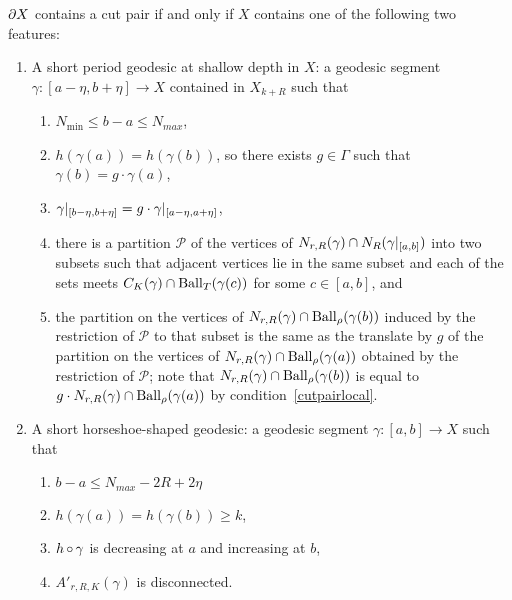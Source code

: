 \begin{prop}\label{prop:cutpairsfeature} $\partial X$ contains a cut pair
if and only if $X$ contains one of the following two features:
\begin{enumerate}
  \item A short period geodesic at shallow depth in $X$: a geodesic segment
    $\gamma \colon [a - \eta, b + \eta] \to X$ contained in $X_{k + R}$ such
    that
  \begin{enumerate}
    \item\label{cutpairshort} $N_\text{min} \leq b - a \leq N_{max}$,
    \item\label{cutpairdepth} $h(\gamma(a)) = h(\gamma(b))$, so there exists $g
      \in \Gamma$ such that $\gamma(b) = g \cdot \gamma(a)$,
    \item\label{cutpairlocal} $\gamma\vert_{[b - \eta, b + \eta]} = g\cdot
      \gamma\vert_{[a - \eta, a + \eta]}$,
    \item\label{cutpairnontrivial} there is a partition $\mathcal{P}$ of the
      vertices of $N_{r, R}(\gamma) \cap
      N_R(\gamma\vert_{[a,b]})$ into two subsets such that adjacent
      vertices lie in the same subset and each of the sets meets $C_K(\gamma)
      \cap \operatorname{\mathrm{Ball}}_T(\gamma(c))$ for some $c \in [a, b]$, and
    \item\label{cutpairpartition} the partition on the vertices of $N_{r,
      R}(\gamma) \cap \operatorname{\mathrm{Ball}}_{\rho}(\gamma(b))$ induced by the restriction of
      $\mathcal{P}$ to that subset is the same as the translate by $g$ of the 
      partition on the vertices of $N_{r, R}(\gamma) \cap
      \operatorname{\mathrm{Ball}}_{\rho}(\gamma(a))$ obtained by the restriction of $\mathcal{P}$; note
      that $N_{r, R}(\gamma) \cap \operatorname{\mathrm{Ball}}_\rho(\gamma(b))$ is equal to $g
      \cdot N_{r, R}(\gamma) \cap \operatorname{\mathrm{Ball}}_\rho(\gamma(a))$ by
      condition~\ref{cutpairlocal}.
  \end{enumerate}
  \item A short horseshoe-shaped geodesic: a geodesic segment $\gamma \colon
    [a, b] \to X$ such that
  \begin{enumerate}
    \item $b - a \leq N_{max} - 2R + 2\eta$
    \item $h(\gamma(a)) = h(\gamma(b)) \geq k$,
    \item $h \operatorname{\circ} \gamma$ is decreasing at $a$ and increasing at $b$,
    \item $A'_{r, R, K}(\gamma)$ is disconnected.
  \end{enumerate}
\end{enumerate}
\end{prop}

